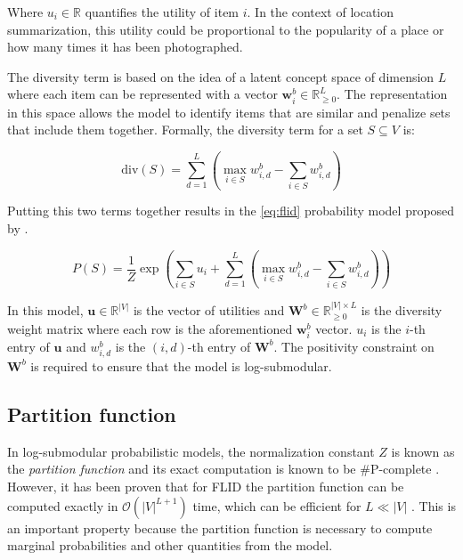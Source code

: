 Where $u_{i} \in \mathbb{R}$ quantifies the utility of item $i$. In the context of location summarization, this utility could be proportional to the popularity of a place or how many times it has been photographed.

The diversity term is based on the idea of a latent concept space of dimension $L$ where each item can be represented with a vector $\mathbf{w}^{b}_{i} \in \mathbb{R}^{L}_{\geq 0}$. The representation in this space allows the model to identify items that are similar and penalize sets that include them together. Formally, the diversity term for a set $S \subseteq V$ is:

\begin{equation}
  \label{eq:diversity}
  \mathrm{div}(S) = \sum_{d=1}^{L}\left(\max_{i \in S}{w^{b}_{i, d}} - \sum_{i \in S}{w^{b}_{i,d}}\right)
\end{equation}

Putting this two terms together results in the \ref{eq:flid} probability model proposed by \citet{tschiatschek16learning}.

\begin{equation}
  \tag{FLID}
  P(S) = \frac{1}{Z}\exp{\left(\sum_{i \in S}u_{i} + \sum_{d=1}^{L}\left(\max_{i \in S}{w^{b}_{i, d}} - \sum_{i \in S}{w^{b}_{i,d}}\right)\right)}
  \label{eq:flid}
\end{equation}

In this model, $\mathbf{u} \in \mathbb{R}^{|V|}$ is the vector of utilities and $\mathbf{W}^{b} \in \mathbb{R}_{\geq 0}^{|V| \times L}$ is the diversity weight matrix where each row is the aforementioned $\mathbf{w}^{b}_{i}$ vector. $u_{i}$ is the $i$-th entry of $\mathbf{u}$ and $w^{b}_{i,d}$ is the $(i,d)$-th entry of $\mathbf{W}^{b}$. The positivity constraint on $\mathbf{W}^{b}$ is required to ensure that the model is log-submodular.

\subsection{Partition function}

In log-submodular probabilistic models, the normalization constant $Z$ is known as the \textit{partition function} \citep{djolonga14variational} and its exact computation is known to be \#P-complete \citep{jerrum1990}.  However, it has been proven that for FLID the partition function can be computed exactly in $\mathcal{O}(|V|^{L+1})$ time, which can be efficient for $L \ll |V|$ \citep{tschiatschek16learning}. This is an important property because the partition function is necessary to compute marginal probabilities and other quantities from the model.


